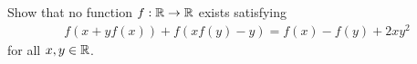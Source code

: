 Show that no function $f:\mathbb{R}\to\mathbb{R}$ exists satisfying
\begin{align*}
    f(x+yf(x))+f(xf(y)-y)=f(x)-f(y)+2xy^2
\end{align*} 
for all $x,y \in \mathbb{R}$.